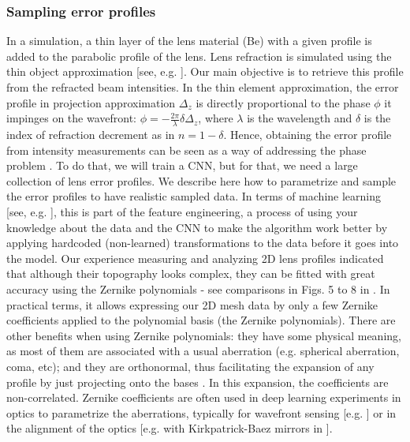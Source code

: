 \documentclass[preprint]{iucr}
\newcommand{\inred}[1]{{\color{red}#1}}
\begin{document}
\subsubsection{Sampling error profiles}
In a simulation, a thin layer of the lens material (Be) with a given profile is added to the parabolic profile of the lens. Lens refraction is simulated using the thin object approximation \inred{[see, e.g. \cite{Celestre2020, multioptics}]}. Our main objective is to retrieve this profile from the refracted beam intensities. \inred{In the thin element approximation, the error profile in projection approximation $\Delta_z$ is directly proportional to the phase $\phi$ it impinges on the wavefront: $\phi = - \frac{2\pi}{\lambda} \delta \Delta_z$, where $\lambda$ is the wavelength and $\delta$ is the index of refraction decrement as in $n=1-\delta$. Hence, obtaining the error profile from intensity measurements can be seen as a way of addressing the phase problem \cite{Taylor1981, Klibanov1995}.}
To do that, we will train a CNN, but for that, we need a large collection of lens error profiles. We describe here how to parametrize and sample the error profiles to have realistic sampled data. In terms of machine learning [see, e.g. \cite{chollet_book}], this is part of the feature engineering, a process of using your knowledge about the data and the CNN to make the algorithm work better by applying hardcoded (non-learned) transformations to the data before it goes into the model.
Our experience measuring and analyzing 2D lens profiles indicated that although their topography looks complex, they can be fitted with great accuracy using the Zernike polynomials \inred{- see comparisons in Figs. 5 to 8 in \cite{Celestre2020}}. In practical terms, it allows expressing our 2D mesh data by only a few Zernike coefficients applied to the polynomial basis (the Zernike polynomials). There are other benefits when using Zernike polynomials: they have some physical meaning, as most of them are associated with a usual aberration (e.g. spherical aberration, coma, etc); and they are orthonormal, thus facilitating the expansion of any profile by just projecting onto the bases \inred{\cite{Mahajan2011}}. In this expansion, the coefficients are non-correlated. Zernike coefficients are often used in deep learning experiments in optics to parametrize the aberrations, typically for wavefront sensing [e.g. \cite{Saha2020}] or in the alignment of the optics [e.g. with Kirkpatrick-Baez mirrors in \cite{Luiz2022}]. 
\end{document}

